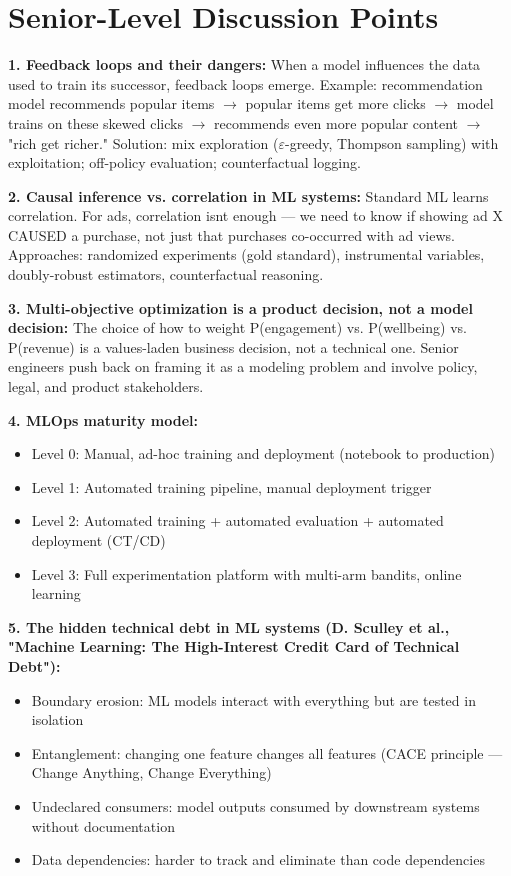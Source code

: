 \documentclass[11pt]{article}
\providecommand{\tightlist}{\setlength{\itemsep}{1pt}\setlength{\parskip}{0pt}}
\begin{document}
\section{Senior-Level Discussion Points}\label{senior-level-discussion-points}

\textbf{1. Feedback loops and their dangers:}
When a model influences the data used to train its successor, feedback loops emerge. Example: recommendation model recommends popular items \(\rightarrow\) popular items get more clicks \(\rightarrow\) model trains on these skewed clicks \(\rightarrow\) recommends even more popular content \(\rightarrow\) "rich get richer." Solution: mix exploration (\(\varepsilon\)-greedy, Thompson sampling) with exploitation; off-policy evaluation; counterfactual logging.

\textbf{2. Causal inference vs. correlation in ML systems:}
Standard ML learns correlation. For ads, correlation isn\textquotesingle t enough --- we need to know if showing ad X CAUSED a purchase, not just that purchases co-occurred with ad views. Approaches: randomized experiments (gold standard), instrumental variables, doubly-robust estimators, counterfactual reasoning.

\textbf{3. Multi-objective optimization is a product decision, not a model decision:}
The choice of how to weight P(engagement) vs. P(wellbeing) vs. P(revenue) is a values-laden business decision, not a technical one. Senior engineers push back on framing it as a modeling problem and involve policy, legal, and product stakeholders.

\textbf{4. MLOps maturity model:}

\begin{itemize}
\tightlist
\item
  Level 0: Manual, ad-hoc training and deployment (notebook to production)
\item
  Level 1: Automated training pipeline, manual deployment trigger
\item
  Level 2: Automated training + automated evaluation + automated deployment (CT/CD)
\item
  Level 3: Full experimentation platform with multi-arm bandits, online learning
\end{itemize}

\textbf{5. The hidden technical debt in ML systems (D. Sculley et al., "Machine Learning: The High-Interest Credit Card of Technical Debt"):}

\begin{itemize}
\tightlist
\item
  Boundary erosion: ML models interact with everything but are tested in isolation
\item
  Entanglement: changing one feature changes all features (CACE principle --- Change Anything, Change Everything)
\item
  Undeclared consumers: model outputs consumed by downstream systems without documentation
\item
  Data dependencies: harder to track and eliminate than code dependencies
\end{itemize}
\end{document}
